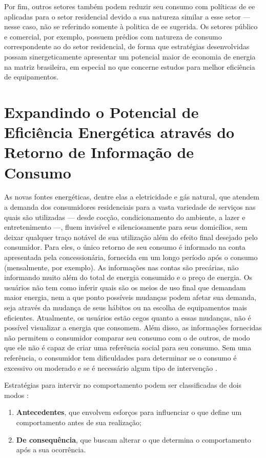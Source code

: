 Por fim, outros setores também podem reduzir seu consumo com políticas de
\gls{ee} aplicadas para o setor residencial devido a sua natureza similar a esse
setor --- nesse caso, não se referindo somente à politica de \gls{ee} sugerida.
Os setores público e comercial, por exemplo, possuem prédios com natureza
de consumo correspondente ao do setor residencial, de forma que estratégias
desenvolvidas possam sinergeticamente apresentar um potencial maior de
economia de energia na matriz brasileira, em especial no que concerne estudos
para melhor eficiência de equipamentos.

\section{Expandindo o Potencial de Eficiência Energética através do Retorno de
Informação de Consumo}
\label{sec:ee_res_exp}

As novas fontes energéticas, dentre elas a eletricidade e gás natural,
que atendem a demanda dos consumidores residenciais para a vasta
variedade de serviços nas quais são utilizadas
--- desde cocção, condicionamento do ambiente, a lazer e
entretenimento ---, fluem invisível e silenciosamente para seus domicílios, sem
deixar qualquer traço notável de sua utilização além do efeito final desejado pelo
consumidor. Para eles, o único retorno de seu consumo é informado na conta
apresentada pela concessionária, fornecida em um longo período após o consumo
(mensalmente, por exemplo). As informações nas contas são precárias, não informando
muito além do total de energia consumido e o preço de energia.
Os usuários não tem como inferir quais são os meios de uso final que demandam
maior energia, nem a que ponto possíveis mudanças podem afetar sua demanda,
seja através da mudança de seus hábitos ou na escolha
de equipamentos mais eficientes. Atualmente, os usuários estão cegos quanto a essas
mudanças, não é possível visualizar a energia que consomem. Além disso, as
informações fornecidas não permitem o consumidor comparar seu consumo com o de
outros, de modo que ele não é capaz de criar uma referência social para seu consumo.
Sem uma referência, o consumidor tem dificuldades para determinar se o consumo é
excessivo ou moderado e se é necessário algum tipo de intervenção
\cite{aceee_2010_estudos_feedback}.

Estratégias para intervir no comportamento podem ser classificadas de dois modos
\cite{aceee_2010_estudos_feedback,2009_epri}:
\begin{enumerate}
\item \textbf{Antecedentes}, que envolvem esforços para influenciar o que define
um comportamento antes de sua realização;
\item \textbf{De consequência}, que buscam alterar o que determina o
comportamento após a sua ocorrência.
\end{enumerate}

